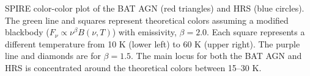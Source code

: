 \label{fig:color-color} SPIRE color-color plot of the BAT AGN (red triangles) and HRS (blue circles). The green line and squares represent theoretical colors assuming a modified blackbody ($F_{\nu} \propto \nu^{\beta}B(\nu, T)$) with emissivity, $\beta=2.0$. Each square represents a different temperature from 10 K (lower left) to 60 K (upper right). The purple line and diamonds are for $\beta=1.5$. The main locus for both the BAT AGN and HRS is concentrated around the theoretical colors between 15--30 K. 
  